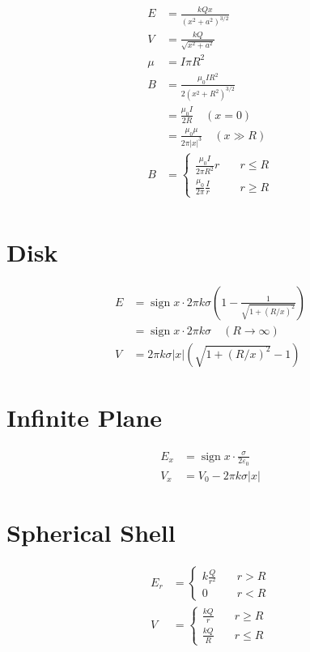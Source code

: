 \documentclass[10pt]{article}
\DeclareMathOperator{\sign}{sign}
\begin{document}
\begin{multicols*}{5}
\begin{align*}
    E &= \frac{kQx}{\left({x^2 + a^2}\right)^{3/2}}\\
    V &= \frac{kQ}{\sqrt{x^2 + a^2}}\\
    \mu &= I\pi R^2\\
    B &= \frac{\mu_0IR^2}{2\left({x^2 + R^2}\right)^{3/2}}\\
	  &= \frac{\mu_0 I}{2R} \quad (x = 0)\\
      &= \frac{\mu_0 \mu}{2\pi |x|^3} \quad (x \gg R)\\
    B &= 
    \begin{cases}
	\frac{\mu_0I}{2\pi R^2} r & \quad r \leq R\\
	\frac{\mu_0}{2\pi} \frac{I}{r} & \quad r \geq R
    \end{cases}\\
\end{align*}

\section{Disk}

\begin{align*}
    E &= \sign x \cdot 2\pi k \sigma \left({1 - \frac{1}{\sqrt{1 +
    (R/x)^2}}}\right)\\
      &= \sign x \cdot 2\pi k \sigma \quad (R \to \infty)\\
    V &= 2\pi k \sigma |x| \left({\sqrt{1 + (R / x)^2} - 1}\right)
\end{align*}

\section{Infinite Plane}

\begin{align*}
    E_x &= \sign x \cdot \frac{\sigma}{2\varepsilon_0}\\
    V_x &= V_0 - 2\pi k \sigma |x|
\end{align*}

\section{Spherical Shell}

\begin{align*}
    E_r &=
    \begin{cases}
    k \frac{Q}{r^2} & \quad r > R\\
    0 & \quad r < R
    \end{cases}\\
    V &=
    \begin{cases}
    \frac{kQ}{r} & \quad r \geq R\\
    \frac{kQ}{R} & \quad r \leq R
    \end{cases}
\end{align*}


\end{multicols*}
\end{document}
